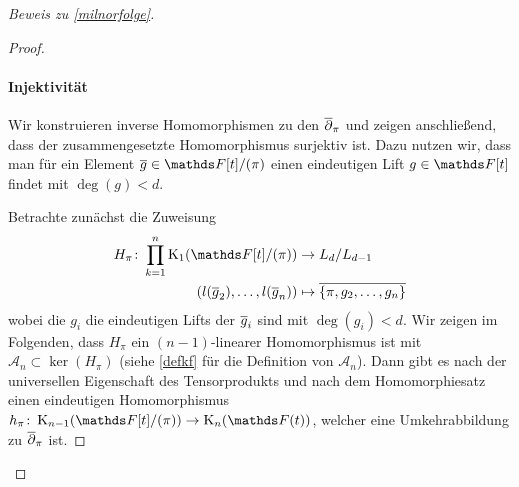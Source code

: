 \documentclass[ngerman,fontsize=11pt, paper=a4, parskip=half, titlepage=true, toc=bib]{scrartcl}
\begin{document}
\begin{proof}[Beweis zu \ref{milnorfolge}]
\begin{proof}
     
    \paragraph{Injektivität}
    Wir konstruieren inverse Homomorphismen zu den $\overline\partial_\pi$
    und zeigen anschließend, dass der zusammengesetzte Homomorphismus
    surjektiv ist.
    Dazu nutzen wir, dass man für ein Element $\ov g\in\Ftpi$ einen
    eindeutigen Lift $g\in\F[t]$ findet mit $\deg(g)<d$.
    
    Betrachte zunächst die Zuweisung
    \begin{align*}
      H_\pi\colon\prod_{k=1}^n \K_1(\Ftpi) 
      &\to L_d/L_{d-1}\\
      \left( l(\ov g_2),\dotsc, l(\ov g_n) \right)
      &\mapsto \ov{\{\pi,g_2,\dotsc,g_n\}}
    \end{align*}
    wobei die $g_i$ die eindeutigen Lifts der $\overline g_i$ sind mit $\deg(g_i)<d$.
    Wir zeigen im Folgenden, dass $H_\pi$ ein $(n-1)$-linearer
    Homomorphismus ist mit $\mathcal{A}_n\subset \ker(H_\pi)$ (siehe
    \ref{defkf} für die Definition von $\mathcal{A}_n$).
    Dann gibt es nach der universellen Eigenschaft des Tensorprodukts
    und nach dem Homomorphiesatz einen eindeutigen Homomorphismus 
    $h_\pi\colon\K_{n-1}(\Ftpi)\to\KnFt$,
    welcher eine Umkehrabbildung zu $\overline\partial_\pi$ ist.
    


\end{proof}
\end{proof}
\end{document}
